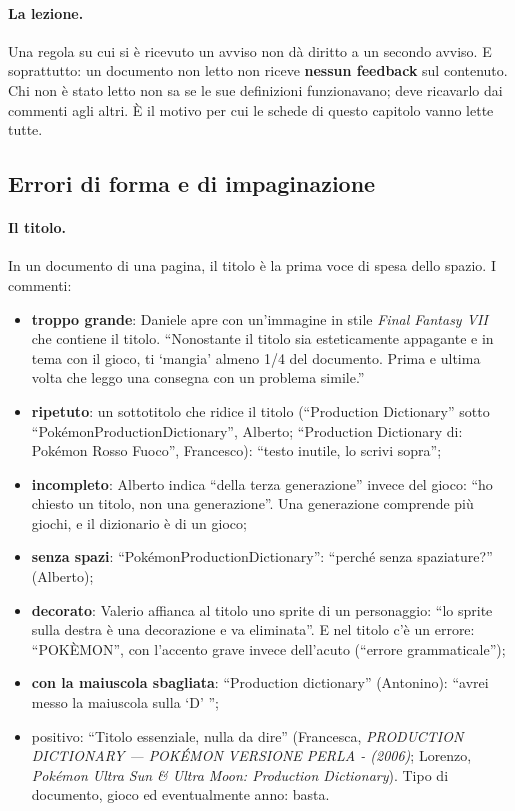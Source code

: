 \paragraph{La lezione.} Una regola su cui si è ricevuto un avviso non dà
diritto a un secondo avviso. E soprattutto: un documento non letto non riceve
\textbf{nessun feedback} sul contenuto. Chi non è stato letto non sa se le sue
definizioni funzionavano; deve ricavarlo dai commenti agli altri. È il motivo
per cui le schede di questo capitolo vanno lette tutte.

\subsection{Errori di forma e di impaginazione}
\label{rv:t2:sec:forma}

\paragraph{Il titolo.} In un documento di una pagina, il titolo è la prima
voce di spesa dello spazio. I commenti:
\begin{itemize}
  \item \textbf{troppo grande}: Daniele apre con un'immagine in stile
        \emph{Final Fantasy VII} che contiene il titolo. ``Nonostante il
        titolo sia esteticamente appagante e in tema con il gioco, ti `mangia'
        almeno 1/4 del documento. Prima e ultima volta che leggo una consegna
        con un problema simile.''
  \item \textbf{ripetuto}: un sottotitolo che ridice il titolo
        (``Production Dictionary'' sotto ``Pokémon\-Production\-Dictionary'',
        Alberto; ``Production Dictionary di: Pokémon Rosso Fuoco'', Francesco):
        ``testo inutile, lo scrivi sopra'';
  \item \textbf{incompleto}: Alberto indica ``della terza generazione'' invece
        del gioco: ``ho chiesto un titolo, non una generazione''. Una
        generazione comprende più giochi, e il dizionario è di un gioco;
  \item \textbf{senza spazi}: ``Pokémon\-Production\-Dictionary'': ``perché senza
        spaziature?'' (Alberto);
  \item \textbf{decorato}: Valerio affianca al titolo uno sprite di un
        personaggio: ``lo sprite sulla destra è una decorazione e va
        eliminata''. E nel titolo c'è un errore: ``POKÈMON'', con l'accento
        grave invece dell'acuto (``errore grammaticale'');
  \item \textbf{con la maiuscola sbagliata}: ``Production dictionary''
        (Antonino): ``avrei messo la maiuscola sulla `D' '';
  \item positivo: ``Titolo essenziale, nulla da dire'' (Francesca,
        \emph{PRODUCTION DICTIONARY --- POKÉMON VERSIONE PERLA - (2006)};
        Lorenzo, \emph{Pokémon Ultra Sun \& Ultra Moon: Production
        Dictionary}). Tipo di documento, gioco ed eventualmente anno: basta.
\end{itemize}

